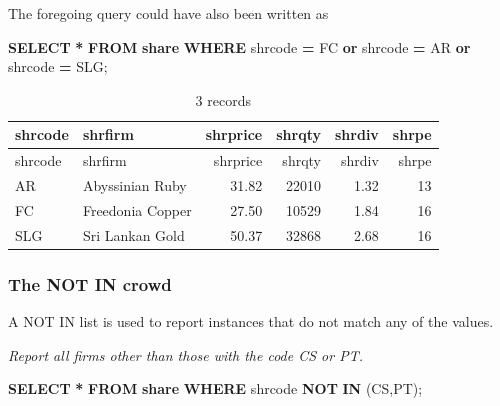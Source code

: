 \documentclass[
]{article}
\newenvironment{Shaded}{\begin{snugshade}}{\end{snugshade}}
\newcommand{\KeywordTok}[1]{\textcolor[rgb]{0.13,0.29,0.53}{\textbf{#1}}}
\newcommand{\NormalTok}[1]{#1}
\newcommand{\OperatorTok}[1]{\textcolor[rgb]{0.81,0.36,0.00}{\textbf{#1}}}
\newcommand{\StringTok}[1]{\textcolor[rgb]{0.31,0.60,0.02}{#1}}
\begin{document}
The foregoing query could have also been written as

\begin{Shaded}
\begin{Highlighting}[]
\KeywordTok{SELECT} \OperatorTok{*} \KeywordTok{FROM} \KeywordTok{share}
  \KeywordTok{WHERE}\NormalTok{ shrcode }\OperatorTok{=} \StringTok{\textquotesingle{}FC\textquotesingle{}} \KeywordTok{or}\NormalTok{ shrcode }\OperatorTok{=} \StringTok{\textquotesingle{}AR\textquotesingle{}} \KeywordTok{or}\NormalTok{ shrcode }\OperatorTok{=} \StringTok{\textquotesingle{}SLG\textquotesingle{}}\NormalTok{;}
\end{Highlighting}
\end{Shaded}

\begin{longtable}[]{@{}llrrrr@{}}
\caption{3 records}\tabularnewline
\toprule()
shrcode & shrfirm & shrprice & shrqty & shrdiv & shrpe \\
\midrule()
\endfirsthead
\toprule()
shrcode & shrfirm & shrprice & shrqty & shrdiv & shrpe \\
\midrule()
\endhead
AR & Abyssinian Ruby & 31.82 & 22010 & 1.32 & 13 \\
FC & Freedonia Copper & 27.50 & 10529 & 1.84 & 16 \\
SLG & Sri Lankan Gold & 50.37 & 32868 & 2.68 & 16 \\
\bottomrule()
\end{longtable}

\hypertarget{the-not-in-crowd}{%
\subsubsection{The NOT IN crowd}\label{the-not-in-crowd}}

A NOT IN list is used to report instances that do not match any of the
values.

\emph{Report all firms other than those with the code CS or PT.}

\begin{Shaded}
\begin{Highlighting}[]
\KeywordTok{SELECT} \OperatorTok{*} \KeywordTok{FROM} \KeywordTok{share} \KeywordTok{WHERE}\NormalTok{ shrcode }\KeywordTok{NOT} \KeywordTok{IN}\NormalTok{ (}\StringTok{\textquotesingle{}CS\textquotesingle{}}\NormalTok{,}\StringTok{\textquotesingle{}PT\textquotesingle{}}\NormalTok{);}
\end{Highlighting}
\end{Shaded}
\end{document}
